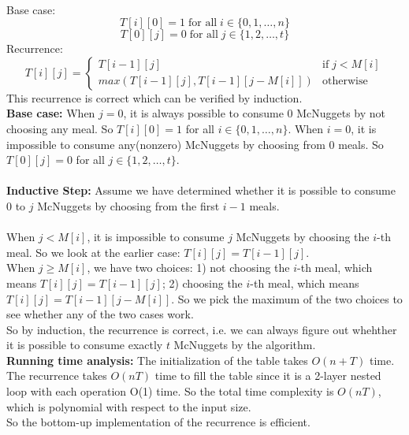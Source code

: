 \documentclass[11pt,addpoints]{exam}
\begin{document}
\begin{questions}
    
    \begin{solution}
    \\Base case:
    $$
    T[i][0] = 1 \; \text{for all} \; i \in \{0, 1, \ldots, n\}
    $$
    $$T[0][j] = 0 \; \text{for all} \; j \in \{1, 2, \ldots, t\}$$
    Recurrence:
    $$
    T[i][j] = \begin{cases}
    T[i-1][j] & \text{if} \;j < M[i] \\
    max(T[i-1][j], T[i-1][j-M[i]]) & \text{otherwise}
    \end{cases}
    $$
    This recurrence is correct which can be verified by induction.\\
    \textbf{Base case:} When $j=0$, it is always possible to consume 0 McNuggets by not choosing any meal. So $T[i][0] = 1$ for all $i \in \{0, 1, \ldots, n\}$. When $i=0$, it is impossible to consume any(nonzero) McNuggets by choosing from 0 meals. So $T[0][j] = 0$ for all $j \in \{1, 2, \ldots, t\}$.\\\\
    \textbf{Inductive Step:} Assume we have determined whether it is possible to consume $0$ to $j$ McNuggets by choosing from the first $i-1$ meals.\\\\
    When $j < M[i]$, it is impossible to consume $j$ McNuggets by choosing the $i$-th meal. So we look at the earlier case: $T[i][j] = T[i-1][j]$.\\
    When $j \geq M[i]$, we have two choices: 1) not choosing the $i$-th meal, which means $T[i][j] = T[i-1][j]$; 2) choosing the $i$-th meal, which means $T[i][j] = T[i-1][j-M[i]]$. So we pick the maximum of the two choices to see whether any of the two cases work.
    \\So by induction, the recurrence is correct, i.e. we can always figure out whehther it is possible to consume exactly $t$ McNuggets by the algorithm.\\
    
    \textbf{Running time analysis:}
    The initialization of the table takes $O(n + T)$ time. The recurrence takes $O(nT)$ time to fill the table since it is a 2-layer nested loop with each operation O(1) time. So the total time complexity is $O(nT)$, which is polynomial with respect to the input size.\\
    So the bottom-up implementation of the recurrence is efficient.
    \end{solution}


\end{questions}
\end{document}
